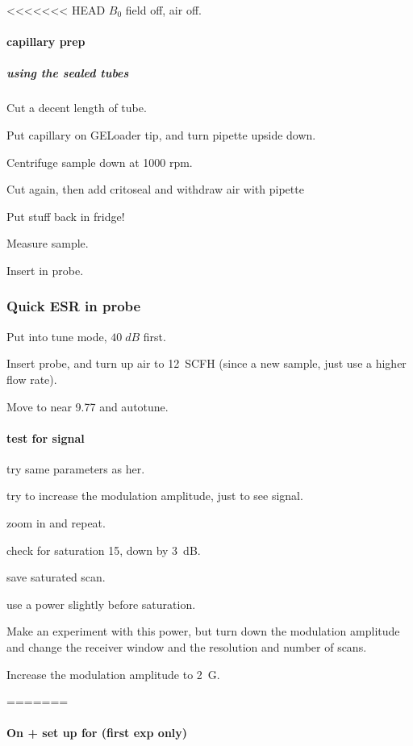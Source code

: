 <<<<<<< HEAD
$B_0$ field off, air off.

\paragraph{capillary prep}
\subparagraph{using the sealed tubes}

Cut a decent length of tube.

Put capillary on GELoader tip, and turn pipette upside down.

Centrifuge sample down at 1000 rpm.

Cut again, then add critoseal and withdraw air with pipette

Put stuff back in fridge!

Measure sample.

Insert in probe.

\subsubsection{Quick ESR in probe}
Put into tune mode, $40\;dB$ first.

Insert probe, and turn up air to 12~SCFH (since a new sample, just use a higher flow rate).

Move to near 9.77 and autotune.

\paragraph{test for signal}
try same parameters as her.

try to increase the modulation amplitude, just to see signal.

zoom in and repeat.

check for saturation 15, down by 3~dB.

save saturated scan.

use a power slightly before saturation.

Make an experiment with this power, but turn down the modulation amplitude and change the receiver window and the resolution and number of scans.

Increase the modulation amplitude to 2~G.

=======
\paragraph{On + set up for (first exp only)}

